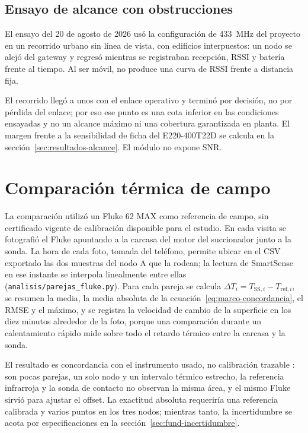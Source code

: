 \subsection{Ensayo de alcance con obstrucciones}
El ensayo del 20 de agosto de 2026 usó la configuración de 433~MHz del proyecto en un recorrido urbano sin línea de vista, con edificios interpuestos: un nodo se alejó del gateway y regresó mientras se registraban recepción, RSSI y batería frente al tiempo. Al ser móvil, no produce una curva de RSSI frente a distancia fija.

El recorrido llegó a unos \DistanciaDemostrada{} con el enlace operativo y terminó por decisión, no por pérdida del enlace; por eso ese punto es una cota inferior en las condiciones ensayadas y no un alcance máximo ni una cobertura garantizada en planta. El margen frente a la sensibilidad de ficha del E220-400T22D se calcula en la sección~\ref{sec:resultados-alcance}. El módulo no expone SNR.

\section{Comparación térmica de campo}
La comparación utilizó un Fluke 62 MAX como referencia de campo, sin certificado vigente de calibración disponible para el estudio. En cada visita se fotografió el Fluke apuntando a la carcasa del motor del succionador junto a la sonda. La hora de cada foto, tomada del teléfono, permite ubicar en el CSV exportado las dos muestras del nodo A que la rodean; la lectura de SmartSense en ese instante se interpola linealmente entre ellas (\texttt{analisis/parejas\_fluke.py}). Para cada pareja se calcula $\Delta T_i=T_{\mathrm{SS},i}-T_{\mathrm{ref},i}$, se resumen la media, la media absoluta de la ecuación~\ref{eq:marco-concordancia}, el RMSE y el máximo, y se registra la velocidad de cambio de la superficie en los diez minutos alrededor de la foto, porque una comparación durante un calentamiento rápido mide sobre todo el retardo térmico entre la carcasa y la sonda.

El resultado es concordancia con el instrumento usado, no calibración trazable \citep{jcgm2012,jcgm2008}: son pocas parejas, un solo nodo y un intervalo térmico estrecho, la referencia infrarroja y la sonda de contacto no observan la misma área, y el mismo Fluke sirvió para ajustar el offset. La exactitud absoluta requeriría una referencia calibrada y varios puntos en los tres nodos; mientras tanto, la incertidumbre se acota por especificaciones en la sección~\ref{sec:fund-incertidumbre}.

